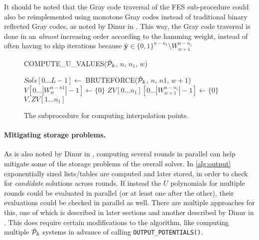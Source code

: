 It should be noted that the Gray code traversal of the FES sub-procedure could also be reimplemented using monotone Gray codes instead of traditional binary reflected Gray codes, as noted by Dinur in \cite{eurocrypt-2021-30841}. This way, the Gray code traversal is done in an \textit{almost} increasing order according to the hamming weight, instead of often having to skip iterations because $\hat{\mathbf{y}} \in \{0, 1\}^{n - n_1} \setminus W^{n - n_1}_{w + 1}$

\begin{figure}[t]
    \centering
    \begin{alg}
        \caption{COMPUTE\_U\_VALUES($\Tilde{\mathcal{P}}_k$, $n$, $n_1$, $w$)} \label{alg:uvalue}
        \label{alg:uvalues}
        $Sols[0\dots L - 1] \gets$ BRUTEFORCE($\Tilde{\mathcal{P}}_k$, $n$, $n1$, $w + 1$)\; \label{alg:uvalues:bruteforce}
        $V[0\dots |W^{n - n1}_w| - 1] \gets \{0\}$\;
        $ZV[0\dots n_1][0\dots |W^{n - n_1}_{w + 1}| - 1] \gets \{0\}$\;
        \Return $V, ZV[1\dots n_1]$\;
    \end{alg}
    \caption{The subprocedure for computing interpolation points.}
\end{figure}

\paragraph{Mitigating storage problems.} As is also noted by Dinur in \cite{eurocrypt-2021-30841}, computing several rounds in parallel can help mitigate some of the storage problems of the overall solver. In \cref{alg:output} exponentially sized lists/tables are computed and later stored, in order to check for \textit{candidate} solutions across rounds. If instead the $U$ polynomials for multiple rounds could be evaluated in parallel (or at least one after the other), their evaluations could be checked in parallel as well. There are multiple approaches for this, one of which is described in later sections and another described by Dinur in \cite{eurocrypt-2021-30841}. This does require certain modifications to the algorithm, like computing multiple $\Tilde{\mathcal{P}}_k$ systems in advance of calling \texttt{OUTPUT\_POTENTIALS()}. 

\newpage